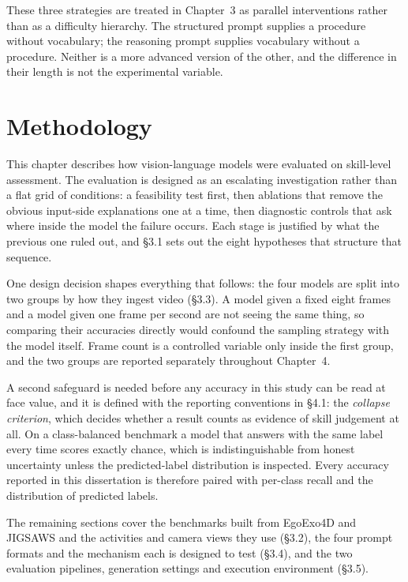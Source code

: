 \documentclass[logo,msc]{infthesis}
\begin{document}
These three strategies are treated in Chapter~3 as parallel interventions
rather than as a difficulty hierarchy. The structured prompt supplies a
procedure without vocabulary; the reasoning prompt supplies vocabulary
without a procedure. Neither is a more advanced version of the other, and
the difference in their length is not the experimental variable.

\chapter{Methodology}

This chapter describes how vision-language models were evaluated on
skill-level assessment. The evaluation is designed as an escalating
investigation rather than a flat grid of conditions: a feasibility test
first, then ablations that remove the obvious input-side explanations one at
a time, then diagnostic controls that ask where inside the model the failure
occurs. Each stage is justified by what the previous one ruled out, and §3.1
sets out the eight hypotheses that structure that sequence.

One design decision shapes everything that follows: the four models are
split into two groups by how they ingest video (§3.3). A model given a fixed
eight frames and a model given one frame per second are not seeing the same
thing, so comparing their accuracies directly would confound the sampling
strategy with the model itself. Frame count is a controlled variable only
inside the first group, and the two groups are reported separately
throughout Chapter~4.

A second safeguard is needed before any accuracy in this study can be read
at face value, and it is defined with the reporting conventions in §4.1: the
\emph{collapse criterion}, which decides whether a result counts as evidence
of skill judgement at all. On a class-balanced benchmark a model that
answers with the same label every time scores exactly chance, which is
indistinguishable from honest uncertainty unless the predicted-label
distribution is inspected. Every accuracy reported in this dissertation is
therefore paired with per-class recall and the distribution of predicted
labels.

The remaining sections cover the benchmarks built from EgoExo4D and JIGSAWS
and the activities and camera views they use (§3.2), the four prompt formats
and the mechanism each is designed to test (§3.4), and the two evaluation
pipelines, generation settings and execution environment (§3.5).
\end{document}
